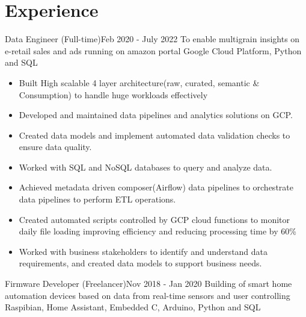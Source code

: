\vspace{-5pt}
\section{Experience}
  \resumeSubHeadingListStart
    {Data Engineer (Full-time)}{Feb 2020 - July 2022}
    \resumeItemListStart
          {To enable multigrain insights on e-retail sales and ads running on amazon portal}
          {Google Cloud Platform, Python and SQL}
          {\begin{itemize}
              \item Built High scalable 4 layer architecture(raw, curated, semantic \& Consumption) to handle huge workloads effectively
              \item Developed and maintained data pipelines and analytics solutions on GCP.
              \item Created data models and implement automated data validation checks to ensure data quality.
              \item Worked with SQL and NoSQL databases to query and analyze data.
              \item Achieved metadata driven composer(Airflow) data pipelines to orchestrate data pipelines to perform ETL operations.
              \item Created automated scripts controlled by GCP cloud functions to monitor daily file loading improving efficiency and reducing processing time by 60\%
              \item Worked with business stakeholders to identify and understand data requirements, and created data models to support business needs.
          \end{itemize}}
      \resumeItemListEnd
    \vspace{-5pt}
    {Firmware Developer (Freelancer)}{Nov 2018 - Jan 2020}
    \resumeItemListStart
          {Building of smart home automation devices based on data from real-time sensors and user controlling}
          {Raspibian, Home Assistant, Embedded C, Arduino, Python and SQL}
